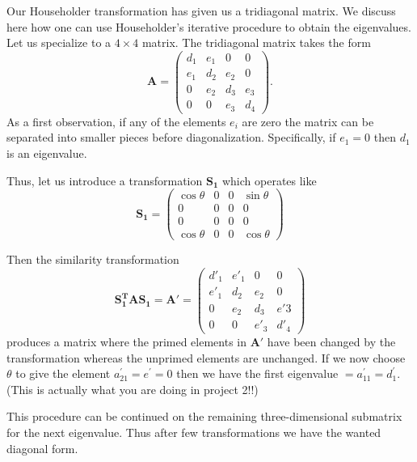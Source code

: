 \documentclass[%
oneside,                 %
final,                   %
10pt]{article}
\begin{document}
Our Householder transformation has given us a tridiagonal matrix. We discuss here how one can use
Householder's iterative procedure to obtain the eigenvalues. 
Let us specialize to a $4\times 4 $ matrix.
The tridiagonal matrix takes the form
\[
 \mathbf{A} =
      \left( \begin{array}{cccc} 
                d_{1} & e_{1} & 0     &  0    \\
                e_{1} & d_{2} & e_{2} &  0    \\
                 0    & e_{2} & d_{3} & e_{3} \\
                 0    &   0   & e_{3} & d_{4} 
             \end{array} \right).
\]
As a first observation, if any of the elements $e_{i}$ are zero the
matrix can be separated into smaller pieces before
diagonalization. Specifically, if $e_{1} = 0$ then $d_{1}$ is an
eigenvalue.

 Thus, let us introduce  a transformation $\mathbf{S_{1}}$ which operates like
\[
 \mathbf{S_{1}} =
      \left( \begin{array}{cccc} 
                \cos \theta & 0 & 0 & \sin \theta\\
                 0       & 0 & 0 &      0      \\
                   0        & 0 & 0 &      0      \\
               \cos \theta & 0 & 0 & \cos \theta 
             \end{array} \right)
\]

Then the similarity transformation 
\[
\mathbf{S_{1}^{T} A  S_{1}} = \mathbf{A'} = 
      \left( \begin{array}{cccc}
              d'_{1} & e'_{1} &   0    &   0   \\
              e'_{1}  & d_{2}  & e_{2}  &   0   \\
                0    & e_{2}  & d_{3}  & e'{3} \\
                0    &   0    & e'_{3} & d'_{4}
             \end{array} \right)
\]
produces a matrix where the primed elements in $\mathbf{A'}$ have been
changed by the transformation whereas the unprimed elements are unchanged.
If we now choose $\theta$ to
give the element $a_{21}^{'} = e^{'}= 0$ then we have the first
eigenvalue  $= a_{11}^{'} = d_{1}^{'}$.
(This is actually what you are doing in project 2!!)

This procedure can be continued on the remaining three-dimensional
submatrix for the next eigenvalue. Thus after few transformations    
we have the wanted diagonal form.
\end{document}
